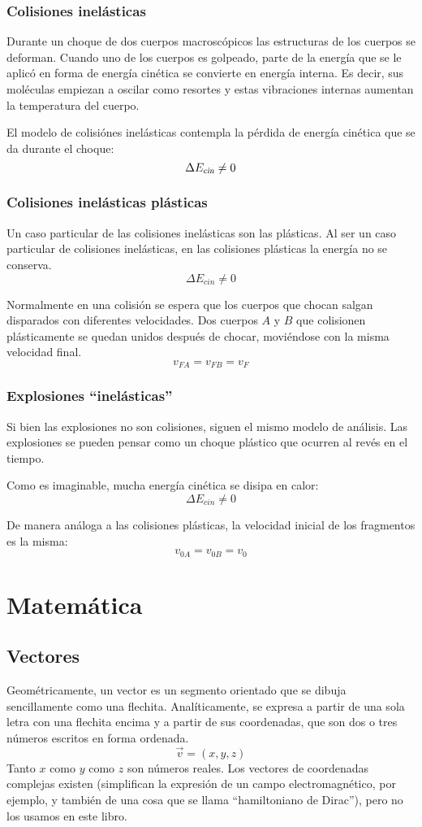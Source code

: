 \documentclass[a5paper,12pt,twoside]{book}
\begin{document}
\subsection{Colisiones inelásticas}

Durante un choque de dos cuerpos macroscópicos las estructuras de los cuerpos se deforman. Cuando uno de los cuerpos es golpeado, parte de la energía que se le aplicó en forma de energía cinética se convierte en energía interna. Es decir, sus moléculas empiezan a oscilar como resortes y estas vibraciones internas aumentan la temperatura del cuerpo.

El modelo de colisiónes inelásticas contempla la pérdida de energía cinética que se da durante el choque:
\[ \Delta {{E}_\textsl{{cin}}} \neq 0 \]


\subsection{Colisiones inelásticas plásticas}

Un caso particular de las colisiones inelásticas son las plásticas. Al ser un caso particular de colisiones inelásticas, en las colisiones plásticas la energía no se conserva.
\[ \Delta E_{cin} \neq 0 \]

Normalmente en una colisión se espera que los cuerpos que chocan salgan disparados con diferentes velocidades. Dos cuerpos $A$ y $B$ que colisionen plásticamente se quedan unidos después de chocar, moviéndose con la misma velocidad final.
\[ v_{FA} = v_{FB} = v_F \]


\subsection{Explosiones ``inelásticas''}

Si bien las explosiones no son colisiones, siguen el mismo modelo de análisis. Las explosiones se pueden pensar como un choque plástico que ocurren al revés en el tiempo.

Como es imaginable, mucha energía cinética se disipa en calor:
\[ \Delta E_{cin} \neq 0 \]

De manera análoga a las colisiones plásticas, la velocidad inicial de los fragmentos es la misma:
\[ v_{0A} = v_{0B} = v_0 \]


\appendix
\chapter{Matemática}


\section{Vectores}
Geométricamente, un vector es un segmento orientado que se dibuja sencillamente como una flechita.
Analíticamente, se expresa a partir de una sola letra con una flechita encima y a partir de sus coordenadas, que son dos o tres números escritos en forma ordenada.
\[ \vec{v} = (x, y, z) \]
Tanto $x$ como $y$ como $z$ son números reales.
Los vectores de coordenadas complejas existen (simplifican la expresión de un campo electromagnético, por ejemplo, y también de una cosa que se llama ``hamiltoniano de Dirac''), pero no los usamos en este libro.
\end{document}
